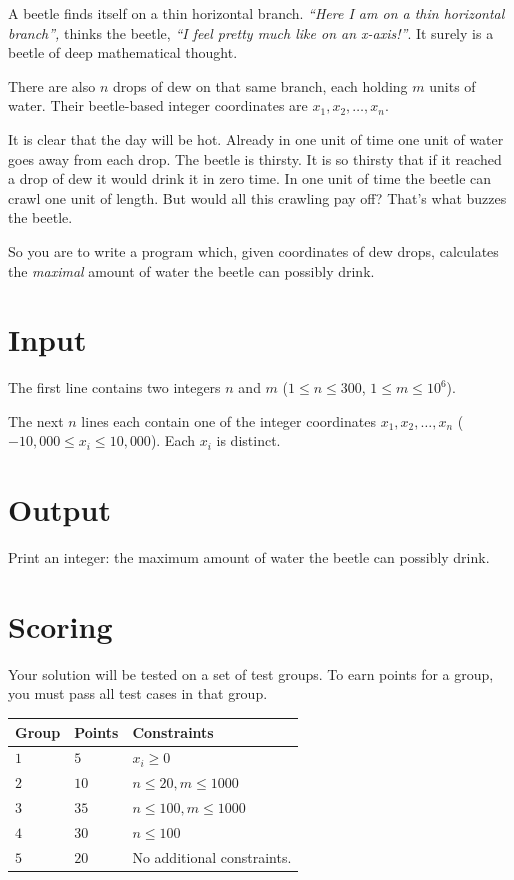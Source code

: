 A beetle finds itself on a thin horizontal branch.
\emph{``Here I am on a thin horizontal branch'',} thinks the beetle, \emph{``I feel pretty much like on an x-axis!''}.
It surely is a beetle of deep mathematical thought.

There are also $n$ drops of dew on that same branch, each holding $m$ units of water.
Their beetle-based integer coordinates are $x_1, x_2, \dots, x_n$.

It is clear that the day will be hot.
Already in one unit of time one unit of water goes away from each drop.
The beetle is thirsty.
It is so thirsty that if it reached a drop of dew it would drink it in zero time.
In one unit of time the beetle can crawl one unit of length.
But would all this crawling pay off?
That's what buzzes the beetle.

So you are to write a program which, given coordinates of dew drops, calculates the \emph{maximal} amount of water the beetle can possibly drink.

\section*{Input}
The first line contains two integers $n$ and $m$ ($1 \le n \le 300$, $1 \leq m \leq 10^6$).

The next $n$ lines each contain one of the integer coordinates $x_1, x_2, \dots, x_n$ ($-10{,}000 \le x_i \le 10{,}000$).
Each $x_i$ is distinct.

\section*{Output}
Print an integer: the maximum amount of water the beetle can possibly drink.

\section*{Scoring}
Your solution will be tested on a set of test groups.
To earn points for a group, you must pass all test cases in that group.

\noindent
\begin{tabular}{| l | l | p{12cm} |}
  \hline
  \textbf{Group} & \textbf{Points} & \textbf{Constraints} \\ \hline
  $1$    & $5$         & $x_i \geq 0$ \\ \hline
  $2$    & $10$        & $n \leq 20, m \leq 1000$ \\ \hline
  $3$    & $35$        & $n \leq 100, m \leq 1000$ \\ \hline
  $4$    & $30$        & $n \leq 100$  \\ \hline
  $5$    & $20$        & No additional constraints.  \\ \hline
\end{tabular}
